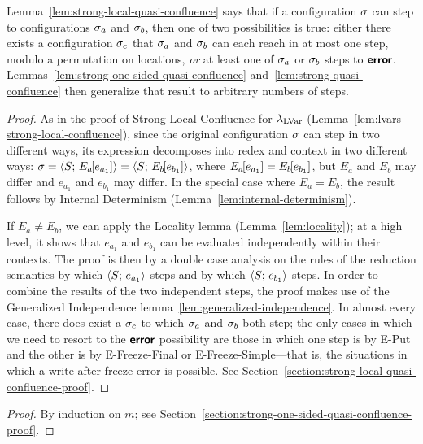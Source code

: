 Lemma~\ref{lem:strong-local-quasi-confluence} says that if a
configuration $\sigma$ can step to configurations $\sigma_a$ and
$\sigma_b$, then one of two possibilities is true: either there exists
a configuration $\sigma_c$ that $\sigma_a$ and $\sigma_b$ can each reach
in at most one step, modulo a permutation on locations, \emph{or} at
least one of $\sigma_a$ or $\sigma_b$ steps to $\textbf{\textsf{error}}$.
Lemmas~\ref{lem:strong-one-sided-quasi-confluence}
and~\ref{lem:strong-quasi-confluence} then generalize that result to
arbitrary numbers of steps.

\LemStrongLocalQuasiConfluence
\begin{proof}
  As in the proof of Strong Local Confluence for $\lambda_{\textrm{LVar}}$
  (Lemma~\ref{lem:lvars-strong-local-confluence}), since the original
  configuration $\sigma$ can step in two different ways, its expression
  decomposes into redex and context in two different ways: $\sigma =
  \langle S;\, E_a\hspace{-1mm}\left[e_{a_1}\right] \rangle =
  \langle S;\, E_b\hspace{-1mm}\left[e_{b_1}\right] \rangle$, where $E_a\hspace{-1mm}\left[e_{a_1}\right]
  = E_b\hspace{-1mm}\left[e_{b_1}\right]$, but $E_a$ and $E_b$ may differ and
  $e_{a_1}$ and $e_{b_1}$ may differ.  In the special case where $E_a
  = E_b$, the result follows by Internal Determinism
  (Lemma~\ref{lem:internal-determinism}).

  If $E_a \neq E_b$, we can apply the Locality lemma
  (Lemma~\ref{lem:locality}); at a high level, it shows that $e_{a_1}$
  and $e_{b_1}$ can be evaluated independently within their contexts.
  The proof is then by a double case analysis on the rules of the
  reduction semantics by which $\langle S;\, e_{a_1} \rangle$ steps and by
  which $\langle S;\, e_{b_1} \rangle$ steps.  In order to combine the results
  of the two independent steps, the proof makes use of the Generalized
  Independence lemma~\ref{lem:generalized-independence}.  In almost
  every case, there does exist a $\sigma_c$ to which $\sigma_a$ and
  $\sigma_b$ both step; the only cases in which we need to resort to
  the $\textbf{\textsf{error}}$ possibility are those in which one step is by {\sc
  E-Put} and the other is by {\sc E-Freeze-Final} or {\sc
  E-Freeze-Simple}---that is, the situations in which a
  write-after-freeze error is possible.  See
  Section~\ref{section:strong-local-quasi-confluence-proof}.
\end{proof}

\LemStrongOneSidedQuasiConfluence
\begin{proof}
  By induction on $m$; see
  Section~\ref{section:strong-one-sided-quasi-confluence-proof}.
\end{proof}

